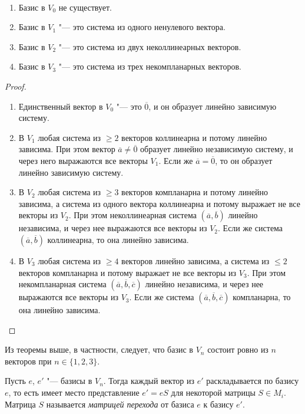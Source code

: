 \begin{theorem}~
	\begin{enumerate}
		\item Базис в $V_0$ не существует.
		\item Базис в $V_1$ "--- это система из одного ненулевого вектора.
		\item Базис в $V_2$ "--- это система из двух неколлинеарных векторов.
		\item Базис в $V_3$ "--- это система из трех некомпланарных векторов.
	\end{enumerate}
\end{theorem}

\begin{proof}~
	\begin{enumerate}
		\item Единственный вектор в $V_0$ "--- это $\overline{0}$, и он образует линейно зависимую систему.
		\item В $V_1$ любая система из $\ge 2$ векторов коллинеарна и потому линейно зависима. При этом вектор $\overline{a} \ne \overline{0}$ образует линейно независимую систему, и через него выражаются все векторы $V_1$. Если же $\overline{a} = \overline{0}$, то он образует линейно зависимую систему.
		\item В $V_2$ любая система из $\ge 3$ векторов компланарна и потому линейно зависима, а система из одного вектора коллинеарна и потому выражает не все векторы из $V_2$. При этом неколлинеарная система $(\overline{a}, \overline{b})$ линейно независима, и через нее выражаются все векторы из $V_2$. Если же система $(\overline{a}, \overline{b})$ коллинеарна, то она линейно зависима.
		\item В $V_3$ любая система из $\ge 4$ векторов линейно зависима, а система из $\le 2$ векторов компланарна и потому выражает не все векторы из $V_3$. При этом некомпланарная система $(\overline{a}, \overline{b}, \overline{c})$ линейно независима, и через нее выражаются все векторы из $V_3$. Если же система $(\overline{a}, \overline{b}, \overline{c})$ компланарна, то она линейно зависима.\qedhere
	\end{enumerate}
\end{proof}

\begin{note}
	Из теоремы выше, в частности, следует, что базис в $V_n$ состоит ровно из $n$ векторов при $n \in \{1, 2, 3\}$.
\end{note}

\begin{definition}
	Пусть $e$, $e'$ "--- базисы в $V_n$. Тогда каждый вектор из $e'$ раскладывается по базису $e$, то есть имеет место представление $e' = eS$ для некоторой матрицы $S \in M_{i}$. Матрица $S$ называется \textit{матрицей перехода} от базиса $e$ к базису $e'$.
\end{definition}

